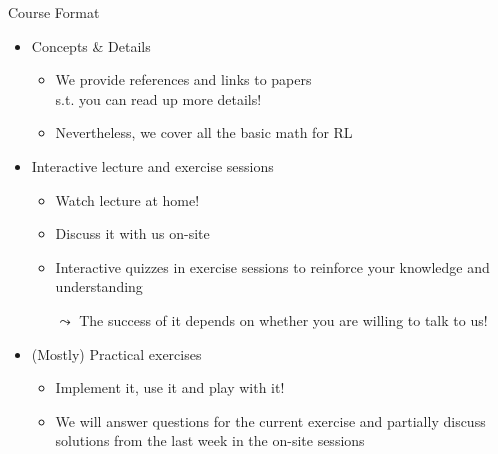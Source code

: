 \documentclass[aspectratio=169]{../latex_main/tntbeamer}  %
\begin{document}
\begin{frame}[c]{Course Format}
	
	\begin{itemize}
		\item Concepts \& Details
		\begin{itemize}
			\item We provide references and links to papers\\ s.t. you can read up more details! 
			\item Nevertheless, we cover all the basic math for RL
		\end{itemize}
		\smallskip
		\item Interactive lecture and exercise sessions
		\begin{itemize}
		    \item Watch lecture at home!
		    \item Discuss it with us on-site
			\item Interactive quizzes in exercise sessions to reinforce your knowledge and understanding
			\item[$\leadsto$] The success of it depends on whether you are willing to talk to us! 
		\end{itemize}
		\smallskip
		\item (Mostly) Practical exercises
		\begin{itemize}
			\item Implement it, use it and play with it!
			\item We will answer questions for the current exercise and partially discuss solutions from the last week in the on-site sessions
		\end{itemize}
	\end{itemize}
	
\end{frame}
\end{document}
